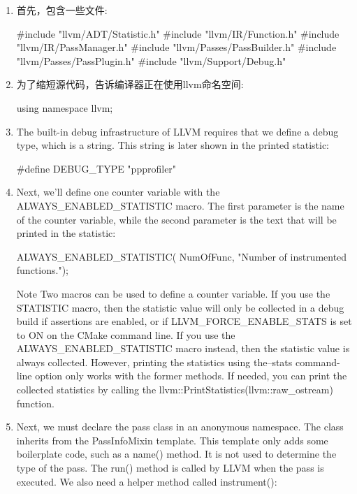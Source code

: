 \begin{enumerate}
\item
首先，包含一些文件:

\begin{cpp}
#include "llvm/ADT/Statistic.h"
#include "llvm/IR/Function.h"
#include "llvm/IR/PassManager.h"
#include "llvm/Passes/PassBuilder.h"
#include "llvm/Passes/PassPlugin.h"
#include "llvm/Support/Debug.h"
\end{cpp}

\item
为了缩短源代码，告诉编译器正在使用llvm命名空间:

\begin{cpp}
using namespace llvm;
\end{cpp}

\item
The built-in debug infrastructure of LLVM requires that we define a debug type, which is a string. This string is later shown in the printed statistic:

\begin{cpp}
#define DEBUG_TYPE "ppprofiler"
\end{cpp}

\item
Next, we’ll define one counter variable with the ALWAYS\_ENABLED\_STATISTIC macro. The first parameter is the name of the counter variable, while the second parameter is the text that will be printed in the statistic:

\begin{cpp}
ALWAYS_ENABLED_STATISTIC(
    NumOfFunc, "Number of instrumented functions.");
\end{cpp}

\begin{myNotic}{Note}
Two macros can be used to define a counter variable. If you use the STATISTIC macro, then the statistic value will only be collected in a debug build if assertions are enabled, or if LLVM\_FORCE\_ENABLE\_STATS is set to ON on the CMake command line. If you use the ALWAYS\_ENABLED\_STATISTIC macro instead, then the statistic value is always collected. However, printing the statistics using the–stats command-line option only works with the former methods. If needed, you can print the collected statistics by calling the llvm::PrintStatistics(llvm::raw\_ostream) function.
\end{myNotic}

\item
Next, we must declare the pass class in an anonymous namespace. The class inherits from the PassInfoMixin template. This template only adds some boilerplate code, such as a name() method. It is not used to determine the type of the pass. The run() method is called by LLVM when the pass is executed. We also need a helper method called instrument():


\end{enumerate}
